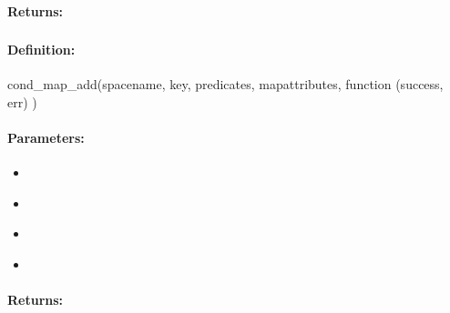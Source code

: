 \paragraph{Returns:}


\pagebreak
\subsubsection{}
\label{api:nodejs:cond_map_add}


\paragraph{Definition:}
\begin{javascriptcode}
cond_map_add(spacename, key, predicates, mapattributes, function (success, err) {})
\end{javascriptcode}
\paragraph{Parameters:}
\begin{itemize}[noitemsep]
\item {}\\

\item {}\\

\item {}\\

\item {}\\

\end{itemize}

\paragraph{Returns:}


\pagebreak
\subsubsection{}
\label{api:nodejs:group_map_add}


